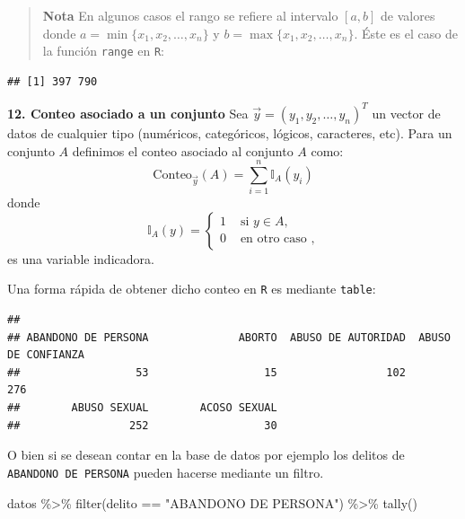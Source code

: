 \documentclass[
]{book}
\newenvironment{Shaded}{\begin{snugshade}}{\end{snugshade}}
\newcommand{\FunctionTok}[1]{\textcolor[rgb]{0.00,0.00,0.00}{#1}}
\newcommand{\NormalTok}[1]{#1}
\newcommand{\SpecialCharTok}[1]{\textcolor[rgb]{0.00,0.00,0.00}{#1}}
\newcommand{\StringTok}[1]{\textcolor[rgb]{0.31,0.60,0.02}{#1}}
\begin{document}
\begin{quote}
\textbf{Nota} En algunos casos el rango se refiere al intervalo \([a,b]\) de valores donde \(a = \min \{x_1, x_2, \dots, x_n\}\) y \(b = \max \{x_1, x_2, \dots, x_n\}\). Éste es el caso de la función \texttt{range} en \texttt{R}:
\end{quote}

\begin{Shaded}
\end{Shaded}

\begin{verbatim}
## [1] 397 790
\end{verbatim}

\textbf{12. Conteo asociado a un conjunto} Sea \(\vec{y} = (y_1, y_2, \dots, y_n)^T\) un vector de datos de cualquier tipo (numéricos, categóricos, lógicos, caracteres, etc). Para un conjunto \(A\) definimos el conteo asociado al conjunto \(A\) como:
\[
\text{Conteo}_{\vec{y}}(A) = \sum\limits_{i = 1}^{n} \mathbb{I}_A (y_i)
\]
donde
\[
\mathbb{I}_A (y) = \begin{cases}
1 & \text{ si } y \in A, \\
0 & \text{ en otro caso },
\end{cases}
\]
es una variable indicadora.

Una forma rápida de obtener dicho conteo en \texttt{R} es mediante \texttt{table}:

\begin{Shaded}
\end{Shaded}

\begin{verbatim}
## 
## ABANDONO DE PERSONA              ABORTO  ABUSO DE AUTORIDAD  ABUSO DE CONFIANZA 
##                  53                  15                 102                 276 
##        ABUSO SEXUAL        ACOSO SEXUAL 
##                 252                  30
\end{verbatim}

O bien si se desean contar en la base de datos por ejemplo los delitos de \texttt{ABANDONO\ DE\ PERSONA} pueden hacerse mediante un filtro.

\begin{Shaded}
\begin{Highlighting}[]
\NormalTok{datos }\SpecialCharTok{\%\textgreater{}\%} \FunctionTok{filter}\NormalTok{(delito }\SpecialCharTok{==} \StringTok{"ABANDONO DE PERSONA"}\NormalTok{) }\SpecialCharTok{\%\textgreater{}\%} \FunctionTok{tally}\NormalTok{()}
\end{Highlighting}
\end{Shaded}
\end{document}

